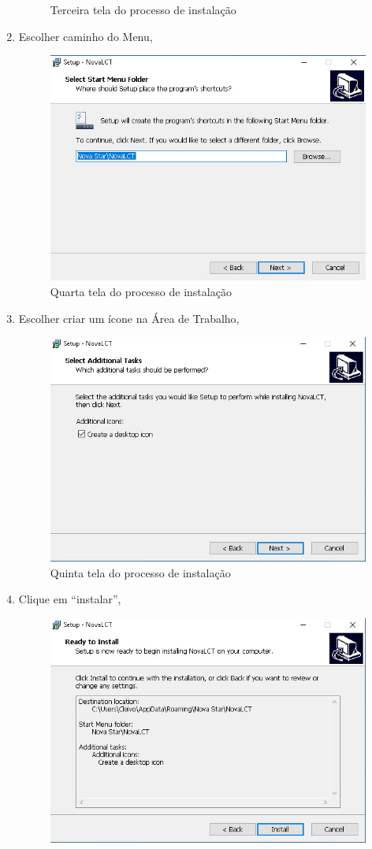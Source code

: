 \documentclass[12pt, a4paper]{article}
\begin{document}
\begin{enumerate}
\begin{figure}[!htb]
			\caption{Terceira tela do processo de instalação}
		\end{figure}
		\newpage
	\item Escolher caminho do Menu,
		\begin{figure}[!htb]
			\centering
			\includegraphics[width=.8\textwidth]{D4.jpeg}
			\caption{Quarta tela do processo de instalação}
		\end{figure}
	\item Escolher criar um ícone na Área de Trabalho,
		\begin{figure}[!htb]
			\centering
			\includegraphics[width=.8\textwidth]{D5.jpeg}
			\caption{Quinta tela do processo de instalação}
		\end{figure}
		\newpage
	\item Clique em ``instalar'',
		\begin{figure}[!htb]
			\centering
			\includegraphics[width=.8\textwidth]{D6.jpeg}

\end{figure}
\end{enumerate}
\end{document}
